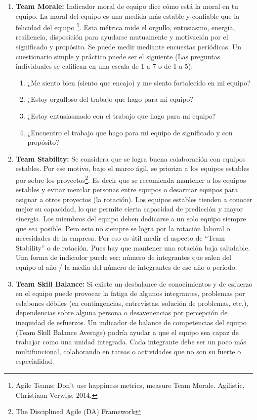 \begin{enumerate}
\item {\textbf{Team Morale:} Indicador moral de equipo dice cómo está la moral en tu equipo. La moral del equipo es una medida más estable y confiable que la felicidad del equipo \footnote{Agile Teams: Don't use happiness metrics, measure Team Morale. Agilistic, Christiaan Verwijs, 2014.}. Esta métrica mide el orgullo, entusiasmo, energía, resiliencia, disposición para ayudarse mutuamente y motivación por el significado y propósito. Se puede medir mediante encuestas periódicas. Un cuestionario simple y práctico puede ser el siguiente (Las preguntas individuales se califican en una escala de 1 a 7 o de 1 a 5):
  \begin{enumerate}
  \item {¿Me siento bien (siento que encajo) y me siento fortalecido en mi equipo?}
  \item {¿Estoy orgulloso del trabajo que hago para mi equipo?}
  \item {¿Estoy entusiasmado con el trabajo que hago para mi equipo?}
  \item {¿Encuentro el trabajo que hago para mi equipo de significado y con propósito?}
  \end{enumerate}
}

\item {\textbf{Team Stability:} Se considera que se logra buena colaboración con equipos estables. Por ese motivo, bajo el marco ágil, se prioriza a los equipos estables por sobre los proyectos\footnote{The Disciplined Agile (DA) Framework}. Es decir que se recomienda mantener a los equipos estables y evitar mezclar personas entre equipos o desarmar equipos para asignar a otros proyectos (la rotación). Los equipos estables tienden a conocer mejor su capacidad, lo que permite cierta capacidad de predicción y mayor sinergia. Los miembros del equipo deben dedicarse a un solo equipo siempre que sea posible. Pero esto no siempre se logra por la rotación laboral o necesidades de la empresa. Por eso es útil medir el aspecto de “Team Stability” o  de rotación. Pues hay que mantener una rotación baja saludable. Una forma de indicador puede ser: número de integrantes que salen del equipo al año / la media del número de integrantes de ese año o período.

}

\item {\textbf{Team Skill Balance:} Si existe un desbalance de conocimientos y de esfuerzo en el equipo puede provocar la fatiga de algunos integrantes, problemas por eslabones débiles (en contingencias, entrevistas, solución de problemas, etc.), dependencias sobre alguna persona o desavenencias por percepción de inequidad de esfuerzos. Un indicador de balance de competencias del equipo (Team Skill Balance Average) podría ayudar a que el equipo sea capaz de trabajar como una unidad integrada. Cada integrante debe ser un poco más multifuncional, colaborando en tareas o actividades que no son su fuerte o especialidad. 
}

\end{enumerate}

